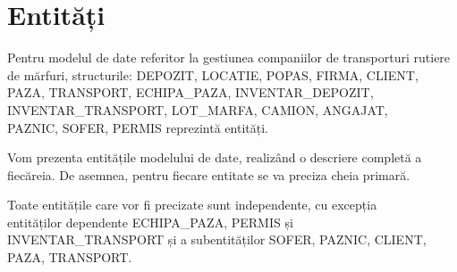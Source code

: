 \documentclass[12pt, a4paper]{article}
\begin{document}
\newpage
\section{Entități}
\quad \par
Pentru modelul de date referitor la gestiunea companiilor de transporturi rutiere de mărfuri, structurile: DEPOZIT, LOCATIE, POPAS, FIRMA, CLIENT, PAZA, TRANSPORT, ECHIPA\_PAZA, INVENTAR\_DEPOZIT, INVENTAR\_TRANSPORT, LOT\_MARFA, CAMION, ANGAJAT,\\ PAZNIC, SOFER, PERMIS reprezintă entități.

Vom prezenta entitățile modelului de date, realizând o descriere completă a fiecăreia. De asemnea, pentru fiecare entitate se va preciza cheia primară.

Toate entitățile care vor fi precizate sunt independente, cu excepția\\ entităților dependente ECHIPA\_PAZA, PERMIS și\\ INVENTAR\_TRANSPORT
și a subentităților SOFER, PAZNIC, CLIENT, PAZA, TRANSPORT.
\end{document}
